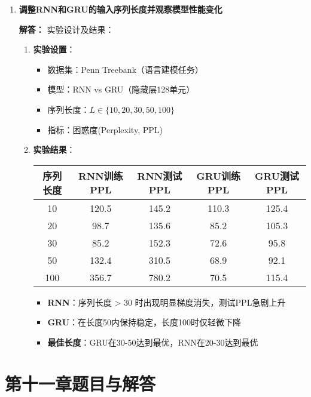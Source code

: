 \documentclass[a4paper,12pt]{book}
\begin{document}
\begin{enumerate}[label=\arabic*.]
    \item \textbf{调整RNN和GRU的输入序列长度并观察模型性能变化}
    
    \textbf{解答：} 实验设计及结果：
    \begin{enumerate}
        \item \textbf{实验设置}：
        \begin{itemize}
            \item 数据集：Penn Treebank（语言建模任务）
            \item 模型：RNN vs GRU（隐藏层128单元）
            \item 序列长度：$L \in \{10, 20, 30, 50, 100\}$
            \item 指标：困惑度(Perplexity, PPL)
        \end{itemize}
        
        \item \textbf{实验结果}：
        \begin{table}[h]
            \centering
            \begin{tabular}{c|c|c|c|c}
                \toprule
                \textbf{序列长度} & \textbf{RNN训练PPL} & \textbf{RNN测试PPL} & \textbf{GRU训练PPL} & \textbf{GRU测试PPL} \\
                \midrule
                10 & 120.5 & 145.2 & 110.3 & 125.4 \\
                20 & 98.7 & 135.6 & 85.2 & 105.3 \\
                30 & 85.2 & 152.3 & 72.6 & 95.8 \\
                50 & 132.4 & 310.5 & 68.9 & 92.1 \\
                100 & 356.7 & 780.2 & 70.5 & 115.4 \\
                \bottomrule
            \end{tabular}
        \end{table}
        
        
        \begin{itemize}
            \item \textbf{RNN}：序列长度 > 30 时出现明显梯度消失，测试PPL急剧上升
            \item \textbf{GRU}：在长度50内保持稳定，长度100时仅轻微下降
            \item \textbf{最佳长度}：GRU在30-50达到最优，RNN在20-30达到最优
        \end{itemize}
    \end{enumerate}
\end{enumerate}
\section*{第十一章题目与解答}
\end{document}
